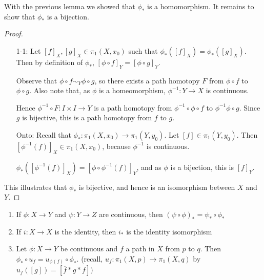 With the previous lemma we showed that $\phi_*$ is a homomorphism. It remains to show that $\phi_*$ is a bijection. 
\begin{proof}
	\begin{itemize}
		\item[1-1:] Let $[f]_X, [g]_X\in \pi_1(X,x_0)$ such that $\phi_* ([f]_X)=\phi_*([g]_X)$. Then by definition of $\phi_*$, $[\phi\circ f]_Y=[\phi\circ g]_Y$. 
		
		Observe that $\phi\circ f\sim_Y \phi\circ g$, so there exists a path homotopy $F$ from $\phi\circ f$ to $\phi\circ g$. Also note that, as $\phi$ is a homeomorphism, $\phi^{-1}:Y\to X$ is continuous.
		
		Hence $\phi^{-1}\circ F:I\times I \to Y$ is a path homotopy from $\phi^{-1}\circ \phi\circ f$ to $\phi^{-1}\phi\circ g.$ Since $g$ is bijective, this is a path homotopy from $f$ to $g$.
		
		\item[Onto:] Recall that $\phi_*:\pi_1(X,x_0)\to \pi_1(Y,y_0)$. Let $[f]\in \pi_1(Y,y_0)$. Then $[\phi^{-1}(f)]_X\in \pi_1(X,x_0)$, because $\phi^{-1}$ is continuous.
		
		$\phi_*([\phi^{-1}(f)]_X)=[\phi\circ \phi^{-1}(f)]_Y$, and as $\phi$ is a bijection, this is $[f]_Y$. 
	\end{itemize}
	
	This illustrates that $\phi_*$ is bijective, and hence is an isomorphism between $X$ and $Y$. 
\end{proof}
\begin{smallfact}
	\begin{enumerate}
		\item If $\phi: X\to Y$ and $\psi: Y\to Z$ are continuous, then $(\psi \circ \phi)_* = \psi_* \circ \phi_*$ 
		\item If $i:X\to X$ is the identity, then $i_*$ is the identity isomorphism 
		\item Let $\phi:X\to Y$ be continuous and $f$ a path in $X$ from $p$ to $q$. Then $\phi_\ast \circ u_f = u_{\phi(f)}\circ \phi_*$. (recall, $u_f:\pi_1 (X,p) \to \pi_1(X,q)$ by $u_f([g]) = [\overline{f} \ast g \ast f ] )$ 
	\end{enumerate}
\end{smallfact}
